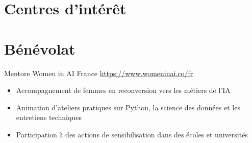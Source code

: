 \documentclass[a4paper, serif, 10pt]{moderncv}
\begin{document}
\section{Centres d'intérêt}

\section{Bénévolat}

        {Mentore}
        {Women in AI France}
        {\url{https://www.womeninai.co/fr}}
        {}
        {\begin{itemize}
\item Accompagnement de femmes en reconversion vers les métiers de l'IA
\item Animation d'ateliers pratiques sur Python, la science des données et les entretiens techniques
\item Participation à des actions de sensibilisation dans des écoles et universités
\end{itemize}}
    
\end{document}
